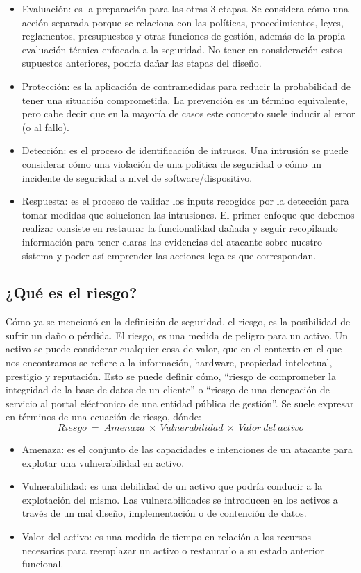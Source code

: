 \begin{itemize}
\item Evaluación: es la preparación para las otras 3 etapas. Se considera cómo una acción separada porque se relaciona con las políticas, procedimientos, leyes, reglamentos, presupuestos y otras funciones de gestión, además de la propia evaluación técnica enfocada a la seguridad. No tener en consideración estos supuestos anteriores, podría dañar las etapas del diseño.
\item Protección: es la aplicación de contramedidas para reducir la probabilidad de tener una situación comprometida. La prevención es un término equivalente, pero cabe decir que en la mayoría de casos este concepto suele inducir al error (o al fallo).
\item Detección: es el proceso de identificación de intrusos. Una intrusión se puede considerar cómo una violación de una política de seguridad o cómo un incidente de seguridad a nivel de software/dispositivo.
\item Respuesta: es el proceso de validar los inputs recogidos por la detección para tomar medidas que solucionen las intrusiones. El primer enfoque que debemos realizar consiste en restaurar la funcionalidad dañada y seguir recopilando información para tener claras las evidencias del atacante sobre nuestro sistema y poder así emprender las acciones legales que correspondan.
\end{itemize}

\subsection{¿Qué es el riesgo?}

Cómo ya se mencionó en la definición de seguridad, el riesgo, es la posibilidad de sufrir un daño o pérdida. El riesgo, es una medida de peligro para un activo. Un activo se puede considerar cualquier cosa de valor, que en el contexto en el que nos encontramos se refiere a la información, hardware, propiedad intelectual, prestigio y reputación. Esto se puede definir cómo, ``riesgo de comprometer la integridad de la base de datos de un cliente'' o ``riesgo de una denegación de servicio al portal eléctronico de una entidad pública de gestión''. Se suele expresar en términos de una ecuación de riesgo, dónde:
$$ Riesgo\ =\ Amenaza\ \times\ Vulnerabilidad\ \times\ Valor\ del\ activo $$

\begin{itemize}
\item Amenaza: es el conjunto de las capacidades e intenciones de un atacante para explotar una vulnerabilidad en activo.
\item Vulnerabilidad: es una debilidad de un activo que podría conducir a la explotación del mismo. Las vulnerabilidades se introducen en los activos a través de un mal diseño, implementación o de contención de datos.
\item Valor del activo: es una medida de tiempo en relación a los recursos necesarios para reemplazar un activo o restaurarlo a su estado anterior funcional.
\end{itemize}

